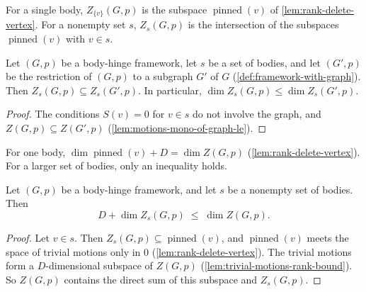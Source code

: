For a single body, $Z_{\{v\}}(G,p)$ is the subspace
$\operatorname{pinned}(v)$ of \cref{lem:rank-delete-vertex}. For a
nonempty set $s$, $Z_s(G,p)$ is the intersection of the subspaces
$\operatorname{pinned}(v)$ with $v \in s$.

\begin{lemma}
  \label{lem:pinned-motions-on-mono}
  \leanok
  Let $(G,p)$ be a body-hinge framework, let $s$ be a set of bodies, and
  let $(G',p)$ be the restriction of $(G,p)$ to a subgraph $G'$ of $G$
  (\cref{def:framework-with-graph}). Then
  $Z_s(G,p) \subseteq Z_s(G',p)$. In particular,
  $\dim Z_s(G,p) \le \dim Z_s(G',p)$.
\end{lemma}
\begin{proof}
  \leanok
  The conditions $S(v) = 0$ for $v \in s$ do not involve the graph, and
  $Z(G,p) \subseteq Z(G',p)$ (\cref{lem:motions-mono-of-graph-le}).
\end{proof}

For one body, $\dim \operatorname{pinned}(v) + D = \dim Z(G,p)$
(\cref{lem:rank-delete-vertex}). For a larger set of bodies, only an
inequality holds.

\begin{lemma}
  \label{lem:pinned-motions-on-rank-bound}
  \leanok
  Let $(G,p)$ be a body-hinge framework, and let $s$ be a nonempty set of
  bodies. Then
  \[
    D + \dim Z_s(G,p) \;\le\; \dim Z(G,p).
  \]
\end{lemma}
\begin{proof}
  \leanok
  Let $v \in s$. Then $Z_s(G,p) \subseteq \operatorname{pinned}(v)$, and
  $\operatorname{pinned}(v)$ meets the space of trivial motions only in
  $0$ (\cref{lem:rank-delete-vertex}). The trivial motions form a
  $D$-dimensional subspace of $Z(G,p)$
  (\cref{lem:trivial-motions-rank-bound}). So $Z(G,p)$ contains the
  direct sum of this subspace and $Z_s(G,p)$.
\end{proof}

